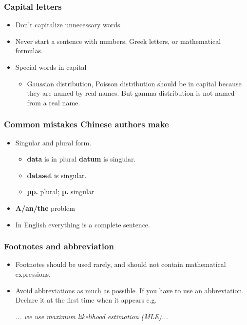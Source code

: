 \documentclass[10pt]{beamer}
\begin{document}
\begin{frame}
  \frametitle{Capital letters}
  \begin{itemize}
  \item Don't capitalize unnecessary words.
  \item Never start a sentence with numbers, Greek letters, or mathematical
    formulas.
  \item Special words in capital
    \begin{itemize}
    \item Gaussian distribution, Poisson distribution should be in capital
      because they are named by real names. But gamma distribution is not named
      from a real name.
    \end{itemize}
  \end{itemize}
\end{frame}

\begin{frame}
  \frametitle{Common mistakes Chinese authors make}

  \begin{itemize}
  \item Singular and plural form.

  \begin{itemize}
  \item \textbf{data} is in plural \textbf{datum} is singular.
  \item \textbf{dataset} is singular.
  \item \textbf{pp.} plural; \textbf{p.} singular
  \end{itemize}

  \item \textbf{A/an/the} problem

  \item In English everything is a complete sentence.

  \end{itemize}



\end{frame}


\begin{frame}
  \frametitle{Footnotes and abbreviation}

  \begin{itemize}
  \item Footnotes should be used rarely, and should not contain mathematical
    expressions.

  \item Avoid abbreviations as much as possible. If you have to use an
    abbreviation. Declare it at the first time when it appears e.g.


\emph{... we use maximum likelihood estimation (MLE)...}

  \end{itemize}
\end{frame}
\end{document}
